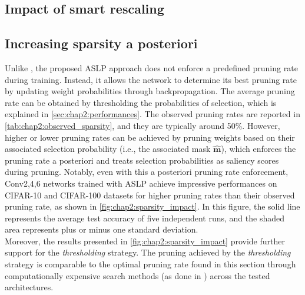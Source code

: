 
\subsection{Impact of smart rescaling}



\subsection{Increasing sparsity a posteriori}
\label{sec:chap2:increasing_sparsity}

Unlike \cite{DBLP:conf/cvpr/RamanujanWKFR20}, the proposed \ac{ASLP} approach
does not enforce a predefined pruning rate during training. Instead, it allows
the network to determine its best pruning rate by updating weight probabilities
through backpropagation. The average pruning rate can be obtained by
thresholding the probabilities of selection, which is explained in
\cref{sec:chap2:performances}. The observed pruning rates are reported in
\cref{tab:chap2:observed_sparsity}, and they are typically around 50\%. However,
higher or lower pruning rates can be achieved by pruning weights based on their
associated selection probability (i.e., the associated mask $\bm{\hat{m}}$),
which enforces the pruning rate a posteriori and treats selection probabilities
as saliency scores during pruning. Notably, even with this a posteriori pruning
rate enforcement, Conv{2,4,6} networks trained with \ac{ASLP} achieve impressive
performances on CIFAR-10 and CIFAR-100 datasets for higher pruning rates than
their observed pruning rate, as shown in \cref{fig:chap2:sparsity_impact}. In
this figure, the solid line represents the average test accuracy of five
independent runs, and the shaded area represents plus or minus one standard
deviation.\\

Moreover, the results presented in \cref{fig:chap2:sparsity_impact} provide
further support for the \textit{thresholding} strategy. The pruning achieved by
the \textit{thresholding} strategy is comparable to the optimal pruning rate
found in this section through computationally expensive search methods (as done
in \cite{DBLP:conf/cvpr/RamanujanWKFR20}) across the tested architectures.

